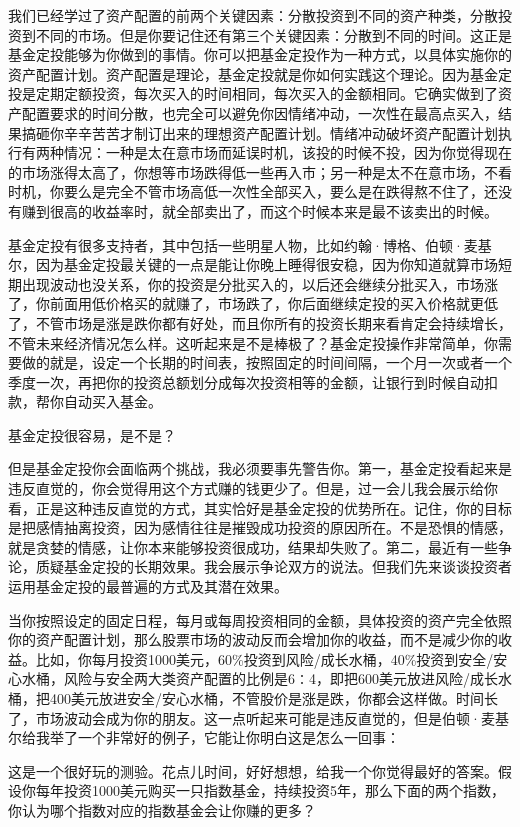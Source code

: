 我们已经学过了资产配置的前两个关键因素：分散投资到不同的资产种类，分散投资到不同的市场。但是你要记住还有第三个关键因素：分散到不同的时间。这正是基金定投能够为你做到的事情。你可以把基金定投作为一种方式，以具体实施你的资产配置计划。资产配置是理论，基金定投就是你如何实践这个理论。因为基金定投是定期定额投资，每次买入的时间相同，每次买入的金额相同。它确实做到了资产配置要求的时间分散，也完全可以避免你因情绪冲动，一次性在最高点买入，结果搞砸你辛辛苦苦才制订出来的理想资产配置计划。情绪冲动破坏资产配置计划执行有两种情况：一种是太在意市场而延误时机，该投的时候不投，因为你觉得现在的市场涨得太高了，你想等市场跌得低一些再入市；另一种是太不在意市场，不看时机，你要么是完全不管市场高低一次性全部买入，要么是在跌得熬不住了，还没有赚到很高的收益率时，就全部卖出了，而这个时候本来是最不该卖出的时候。

基金定投有很多支持者，其中包括一些明星人物，比如约翰·博格、伯顿·麦基尔，因为基金定投最关键的一点是能让你晚上睡得很安稳，因为你知道就算市场短期出现波动也没关系，你的投资是分批买入的，以后还会继续分批买入，市场涨了，你前面用低价格买的就赚了，市场跌了，你后面继续定投的买入价格就更低了，不管市场是涨是跌你都有好处，而且你所有的投资长期来看肯定会持续增长，不管未来经济情况怎么样。这听起来是不是棒极了？基金定投操作非常简单，你需要做的就是，设定一个长期的时间表，按照固定的时间间隔，一个月一次或者一个季度一次，再把你的投资总额划分成每次投资相等的金额，让银行到时候自动扣款，帮你自动买入基金。

基金定投很容易，是不是？

但是基金定投你会面临两个挑战，我必须要事先警告你。第一，基金定投看起来是违反直觉的，你会觉得用这个方式赚的钱更少了。但是，过一会儿我会展示给你看，正是这种违反直觉的方式，其实恰好是基金定投的优势所在。记住，你的目标是把感情抽离投资，因为感情往往是摧毁成功投资的原因所在。不是恐惧的情感，就是贪婪的情感，让你本来能够投资很成功，结果却失败了。第二，最近有一些争论，质疑基金定投的长期效果。我会展示争论双方的说法。但我们先来谈谈投资者运用基金定投的最普遍的方式及其潜在效果。

当你按照设定的固定日程，每月或每周投资相同的金额，具体投资的资产完全依照你的资产配置计划，那么股票市场的波动反而会增加你的收益，而不是减少你的收益。比如，你每月投资1000美元，60\%投资到风险/成长水桶，40\%投资到安全/安心水桶，风险与安全两大类资产配置的比例是6∶4，即把600美元放进风险/成长水桶，把400美元放进安全/安心水桶，不管股价是涨是跌，你都会这样做。时间长了，市场波动会成为你的朋友。这一点听起来可能是违反直觉的，但是伯顿·麦基尔给我举了一个非常好的例子，它能让你明白这是怎么一回事：

这是一个很好玩的测验。花点儿时间，好好想想，给我一个你觉得最好的答案。假设你每年投资1000美元购买一只指数基金，持续投资5年，那么下面的两个指数，你认为哪个指数对应的指数基金会让你赚的更多？


